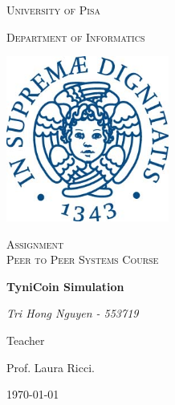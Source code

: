 \documentclass[14pt,a4paper]{report}
\begin{document}
	\begin{titlepage}
		\centering
		{\scshape\LARGE University of Pisa \par}
		{\scshape Department of Informatics\par}
		\vspace{1.0cm}
		\includegraphics[width=0.4\textwidth]{image/Unipi_Image}\par\vspace{1cm}
		\vspace{0.5cm}
		{\scshape\Large Assignment\\Peer to Peer Systems Course\par}
		\vspace{1.cm}
		{\huge\bfseries TyniCoin Simulation\par}
		\vspace{2cm}
		{\Large\itshape Tri Hong Nguyen - 553719\par}
		\vfill
		Teacher\par
		Prof. Laura Ricci.
		\vfill
		{\large \today\par}
	\end{titlepage}
\end{document}
